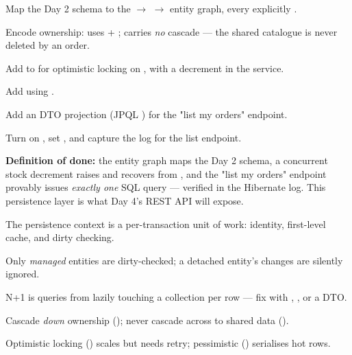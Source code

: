 \begin{buildalong}
\begin{wbitem}
  \item Map the Day 2 schema to the  $\rightarrow$  $\rightarrow$  entity graph, every  explicitly .
  \item Encode ownership:  uses  + ;  carries \emph{no} cascade --- the shared catalogue is never deleted by an order.
  \item Add  to  for optimistic locking on , with a  decrement in the service.
  \item Add  using .
  \item Add an  DTO projection (JPQL ) for the "list my orders" endpoint.
  \item Turn on , set , and capture the log for the list endpoint.
\end{wbitem}
\smallskip\textbf{Definition of done:} the entity graph maps the Day 2 schema, a concurrent stock decrement raises and recovers from , and the "list my orders" endpoint provably issues \emph{exactly one} SQL query --- verified in the Hibernate log. This persistence layer is what Day 4's REST API will expose.
\end{buildalong}


\begin{tickcheck}
  \item The persistence context is a per-transaction unit of work: identity, first-level cache, and dirty checking.
  \item Only \emph{managed} entities are dirty-checked; a detached entity's changes are silently ignored.
  \item N+1 is  queries from lazily touching a collection per row --- fix with , , or a DTO.
  \item Cascade \emph{down} ownership (); never cascade  across to shared data ().
  \item Optimistic locking () scales but needs retry; pessimistic () serialises hot rows.
\end{tickcheck}

